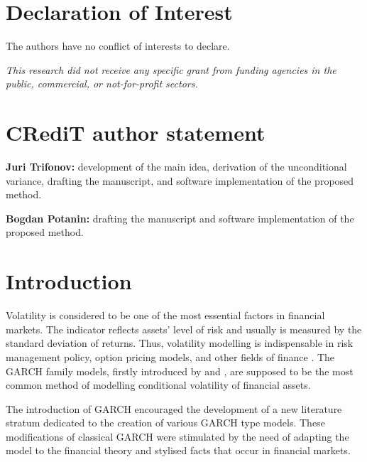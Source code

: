 \documentclass[authoryear, 1p]{elsarticle}
\numberwithin{equation}{section}
\begin{document}
\section*{Declaration of Interest}
\noindent The authors have no conflict of interests to declare.
\vspace{2pt}

\noindent \textit{This research did not receive any specific grant from funding agencies in the public, commercial, or not-for-profit sectors.}
\section*{CRediT author statement}
\begin{flushleft}
\textbf{Juri Trifonov:} development of the main idea, derivation of the unconditional variance, drafting the manuscript, and software implementation of the proposed method.

\textbf{Bogdan Potanin:} drafting the manuscript and software implementation of the proposed method.
\end{flushleft}


\newpage
\section{Introduction}\label{Section1}
Volatility is considered to be one of the most essential factors in financial markets. The indicator reflects assets' level of risk and usually is measured by the standard deviation of returns. Thus, volatility modelling is indispensable in risk management policy, option pricing models, and other fields of finance \citep{Miralles2013}. The GARCH family models, firstly introduced by \citep{Engle1982} and \citep{Bollerslev1986}, are supposed to be the most common method of modelling conditional volatility of financial assets. 

The introduction of GARCH encouraged the development of a new literature stratum dedicated to the creation of various GARCH type models. These modifications of classical GARCH were stimulated by the need of adapting the model to the financial theory and stylised facts that occur in financial markets.
\end{document}
